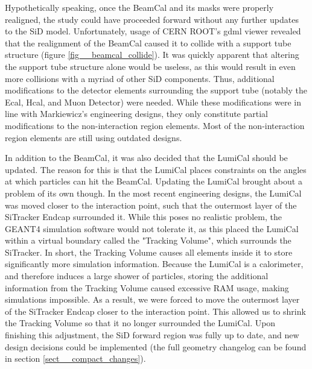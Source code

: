 \documentclass{report}
\begin{document}
            Hypothetically speaking, once the BeamCal and its masks were properly realigned, the study could have proceeded forward without any further updates to the SiD model. Unfortunately, usage of CERN ROOT's gdml viewer revealed that the realignment of the BeamCal caused it to collide with a support tube structure (figure \ref{fig__beamcal_collide}). It was quickly apparent that altering the support tube structure alone would be useless, as this would result in even more collisions with a myriad of other SiD components. Thus, additional modifications to the detector elements surrounding the support tube (notably the Ecal, Hcal, and Muon Detector) were needed. While these modifications were in line with Markiewicz's engineering designs, they only constitute partial modifications to the non-interaction region elements. Most of the non-interaction region elements are still using outdated designs.

            In addition to the BeamCal, it was also decided that the LumiCal should be updated. The reason for this is that the LumiCal places constraints on the angles at which particles can hit the BeamCal. Updating the LumiCal brought about a problem of its own though. In the most recent engineering designs, the LumiCal was moved closer to the interaction point, such that the outermost layer of the SiTracker Endcap surrounded it. While this poses no realistic problem, the GEANT4 simulation software would not tolerate it, as this placed the LumiCal within a virtual boundary called the "Tracking Volume", which surrounds the SiTracker. In short, the Tracking Volume causes all elements inside it to store significantly more simulation information. Because the LumiCal is a calorimeter, and therefore induces a large shower of particles, storing the additional information from the Tracking Volume caused excessive RAM usage, making simulations impossible. As a result, we were forced to move the outermost layer of the SiTracker Endcap closer to the interaction point. This allowed us to shrink the Tracking Volume so that it no longer surrounded the LumiCal. Upon finishing this adjustment, the SiD forward region was fully up to date, and new design decisions could be implemented (the full geometry changelog can be found in section \ref{sect__compact_changes}).
\end{document}
